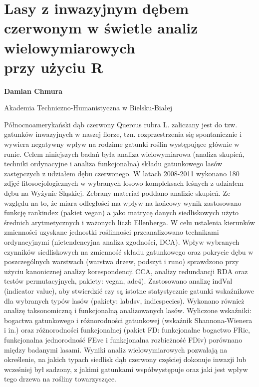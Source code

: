 \documentclass[\main/boa.tex]{subfiles}
\begin{document}
\section{Lasy z inwazyjnym dębem czerwonym w świetle analiz wielowymiarowych \\ przy użyciu R }

\begin{minipage}{0.915\textwidth}
	\centering
  {\bf {} Damian Chmura }
\end{minipage}


\begin{affiliations}
\begin{minipage}{0.915\textwidth}
\centering
Akademia Techniczno-Humanistyczna w Bielsku-Białej  \\[-2pt]
\end{minipage}
\end{affiliations}

\vskip 0.3cm

 Północnoamerykański dąb czerwony Quercus rubra L. zaliczany jest do tzw. gatunków inwazyjnych w naszej florze, tzn. rozprzestrzenia się spontanicznie i wywiera negatywny wpływ na rodzime gatunki roślin występujące głównie w runie. Celem niniejszych badań była analiza wielowymiarowa (analiza skupień, techniki ordynacyjne i analiza funkcjonalna) składu gatunkowego lasów zastępczych z udziałem dębu czerwonego. W latach 2008-2011 wykonano 180 zdjęć fitosocjologicznych w wybranych losowo kompleksach leśnych z udziałem dębu na Wyżynie Śląskiej. Zebrany materiał poddano analizie skupień. Ze względu na to, że miara odległości ma wpływ na końcowy wynik zastosowano funkcję rankindex (pakiet vegan) a jako matrycę danych siedliskowych użyto średnich arytmetycznych i ważonych liczb Ellenberga. W celu ustalenia kierunków zmienności uzyskane jednostki roślinności przeanalizowano technikami ordynacyjnymi (nietendencyjna analiza zgodności, DCA). Wpływ wybranych czynników siedliskowych na zmienność składu gatunkowego oraz pokrycie dębu w poszczególnych warstwach (warstwa drzew, podszyt i runo) sprawdzono przy użyciu kanonicznej analizy korespondencji CCA, analizy redundancji RDA oraz testów permutacyjnych, pakiety: vegan, ade4). Zastosowano analizę indVal (indicator value), aby stwierdzić czy są istotne statystycznie gatunki wskaźnikowe dla wybranych typów lasów (pakiety: labdsv, indicspecies). Wykonano również analizę taksonomiczną i funkcjonalną analizowanych lasów. Wyliczone wskaźniki: bogactwa gatunkowego i różnorodności gatunkowej \break (wskaźnik Shannona-Wienera i in.) oraz różnorodności funkcjonalnej (pakiet FD: funkcjonalne bogactwo FRic, funkcjonalna jednorodność FEve i funkcjonalna rozbieżność FDiv) porównano między badanymi lasami. Wyniki analiz wielowymiarowych pozwalają na określenie, na jakich typach siedlisk dąb czerwony częściej dokonuje inwazji lub wcześniej był sadzony, z jakimi gatunkami współwystępuje oraz jaki jest wpływ tego drzewa na rośliny towarzyszące. 
\end{document}
